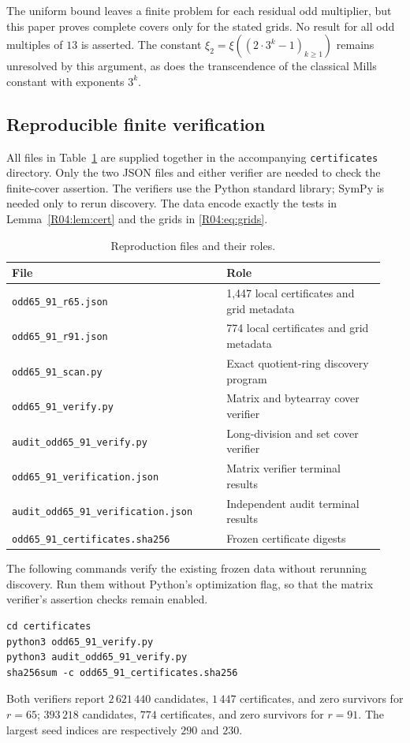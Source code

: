 \documentclass[11pt,a4paper]{article}
\theoremstyle{definition}\newtheorem{definition}[theorem]{Definition}
\theoremstyle{remark}\newtheorem{remark}[theorem]{Remark}
\begin{document}
The uniform bound leaves a finite problem for each residual odd
multiplier, but this paper proves complete covers only for the stated
grids. No result for all odd multiples of $13$ is asserted.
The constant $\xi_2=\xi((2\cdot3^k-1)_{k\ge1})$ remains unresolved
by this argument, as does the transcendence of the classical Mills
constant with exponents $3^k$.


\subsection{Reproducible finite verification}
\label{R04:app:reproduce}

All files in Table~\ref{R04:tab:files} are supplied together in the
accompanying \texttt{certificates} directory. Only the two JSON files and
either verifier are needed to check the finite-cover assertion.
The verifiers use the Python standard library; SymPy is needed only
to rerun discovery. The data encode exactly the tests in
Lemma~\ref{R04:lem:cert} and the grids in \eqref{R04:eq:grids}.

\begin{table}[htbp]
\centering\small
\caption{Reproduction files and their roles.}\label{R04:tab:files}
\begin{tabular}{@{}p{0.54\linewidth}p{0.40\linewidth}@{}}
\toprule
File&Role\\\midrule
\texttt{odd65\_91\_r65.json}&1,447 local certificates and grid metadata\\
\texttt{odd65\_91\_r91.json}&774 local certificates and grid metadata\\
\texttt{odd65\_91\_scan.py}&Exact quotient-ring discovery program\\
\texttt{odd65\_91\_verify.py}&Matrix and bytearray cover verifier\\
\texttt{audit\_odd65\_91\_verify.py}&Long-division and set cover verifier\\
\texttt{odd65\_91\_verification.json}&Matrix verifier terminal results\\
\texttt{audit\_odd65\_91\_verification.json}&Independent audit terminal results\\
\texttt{odd65\_91\_certificates.sha256}&Frozen certificate digests\\
\bottomrule
\end{tabular}
\end{table}

The following commands verify the existing frozen data without
rerunning discovery. Run them without Python's optimization flag,
so that the matrix verifier's assertion checks remain enabled.
\begin{lstlisting}
cd certificates
python3 odd65_91_verify.py
python3 audit_odd65_91_verify.py
sha256sum -c odd65_91_certificates.sha256
\end{lstlisting}
Both verifiers report $2\,621\,440$ candidates, $1\,447$ certificates,
and zero survivors for $r=65$; $393\,218$ candidates, $774$
certificates, and zero survivors for $r=91$.
The largest seed indices are respectively $290$ and $230$.
\end{document}
